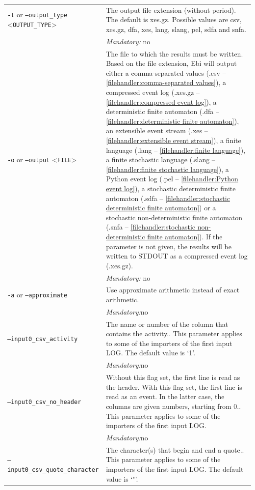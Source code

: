 {\begin{tabularx}{\linewidth}{lX}
\texttt{-t} or \texttt{--output\_type} <\texttt{OUTPUT\_TYPE}> &
The output file extension (without period). The default is xes.gz. Possible values are csv, xes.gz, dfa, xes, lang, slang, pel, sdfa and snfa.\\
&\textit{Mandatory:} \quad no\\
\texttt{-o} or \texttt{--output} <\texttt{FILE}> &
The file to which the results must be written. Based on the file extension, Ebi will output either a comma-separated values (.csv -- \cref{filehandler:comma-separated values}), a compressed event log (.xes.gz -- \cref{filehandler:compressed event log}), a deterministic finite automaton (.dfa -- \cref{filehandler:deterministic finite automaton}), an extensible event stream (.xes -- \cref{filehandler:extensible event stream}), a finite language (.lang -- \cref{filehandler:finite language}), a finite stochastic language (.slang -- \cref{filehandler:finite stochastic language}), a Python event log (.pel -- \cref{filehandler:Python event log}), a stochastic deterministic finite automaton (.sdfa -- \cref{filehandler:stochastic deterministic finite automaton}) or a stochastic non-deterministic finite automaton (.snfa -- \cref{filehandler:stochastic non-deterministic finite automaton}).
If the parameter is not given, the results will be written to STDOUT as a compressed event log (.xes.gz).\\
&\textit{Mandatory:} \quad no\\
\texttt{-a} or \texttt{--approximate} & Use approximate arithmetic instead of exact arithmetic.\\
&\textit{Mandatory:}\quad no\\
\texttt{--input0\_csv\_activity} & The name or number of the column that contains the activity.. This parameter applies to some of the importers of the first input LOG. The default value is `1'.\\
&\textit{Mandatory:}\quad no\\
\texttt{--input0\_csv\_no\_header} & Without this flag set, the first line is read as the header. 
    With this flag set, the first line is read as an event. In the latter case, the columns are given numbers, starting from 0.. This parameter applies to some of the importers of the first input LOG. \\
&\textit{Mandatory:}\quad no\\
\texttt{--input0\_csv\_quote\_character} & The character(s) that begin and end a quote.. This parameter applies to some of the importers of the first input LOG. The default value is `"'.\\

\end{tabularx}}

